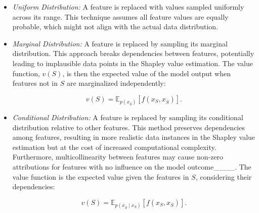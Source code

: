 

\begin{itemize}
    \item \textit{Uniform Distribution:} A feature is replaced with values sampled uniformly across its range. This technique assumes all feature values are equally probable, which might not align with the actual data distribution.
    \item \textit{Marginal Distribution:} A feature is replaced by sampling its marginal distribution. This approach breaks dependencies between features, potentially leading to implausible data points in the Shapley value estimation. The value function, \( v(S) \), is then the expected value of the model output when features not in \( S \) are marginalized independently:
    
    \begin{equation}
    v(S) = \mathbb{E}_{p(x_{\bar{S}})}[f(x_S, x_{\bar{S}})].
    \label{eq:shapleyvalues-marginal}
    \end{equation}
    
    \item \textit{Conditional Distribution:} A feature is replaced by sampling its conditional distribution relative to other features. This method preserves dependencies among features, resulting in more realistic data instances in the Shapley value estimation but at the cost of increased computational complexity. Furthermore, multicollinearity between features may cause non-zero attributions for features with no influence on the model outcome____. The value function is the expected value given the features in \( S \), considering their dependencies:
    
    \begin{equation}
    v(S) = \mathbb{E}_{p(x_{\bar{S}} \mid x_S)}[f(x_S, x_{\bar{S}})].
    \label{eq:shapleyvalues-conditional}
    \end{equation}
\end{itemize}

